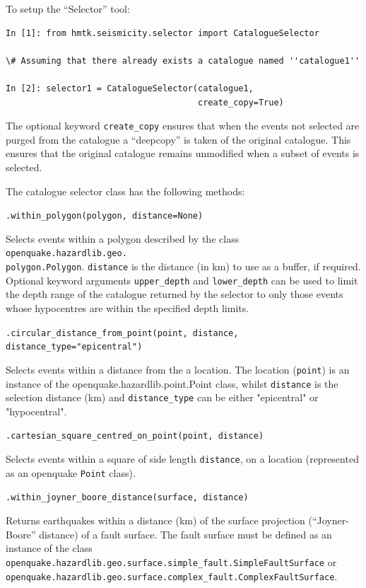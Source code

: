 To setup the ``Selector'' tool:

\begin{Verbatim}[frame=single, commandchars=\\\{\}, fontsize=\scriptsize, samepage=true]
In [1]: from hmtk.seismicity.selector import CatalogueSelector

\# Assuming that there already exists a catalogue named ''catalogue1''

In [2]: selector1 = CatalogueSelector(catalogue1,
                                      create_copy=True)

\end{Verbatim}

The optional keyword \verb=create_copy= ensures that when the events not selected are purged from the catalogue a ``deepcopy'' is taken of the original catalogue. This ensures that the original catalogue remains unmodified when a subset of events is selected.

The catalogue selector class has the following methods:

\verb;.within_polygon(polygon, distance=None);

Selects events within a polygon described by the class \verb=openquake.hazardlib.geo.=\\\verb=polygon.Polygon=. \verb=distance= is the distance (in km) to use as a buffer, if required. Optional keyword arguments \verb=upper_depth= and \verb=lower_depth= can be used to limit the depth range of the catalogue returned by the selector to only those events whose hypocentres are within the specified depth limits.

\verb;.circular_distance_from_point(point, distance, distance_type="epicentral");

Selects events within a distance from the a location. The location (\verb=point=) is an instance of the openquake.hazardlib.point.Point class, whilst \verb=distance= is the selection distance (km) and \verb=distance_type= can be either "epicentral" or "hypocentral".  

\verb;.cartesian_square_centred_on_point(point, distance);

Selects events within a square of side length \verb=distance=, on a location (represented as an openquake \verb=Point= class).

\verb;.within_joyner_boore_distance(surface, distance);

Returns earthquakes within a distance (km) of the surface projection (``Joyner-Boore'' distance) of a fault surface. The fault surface must be defined as an instance of the class \verb=openquake.hazardlib.geo.surface.simple_fault.SimpleFaultSurface= or\\ \verb=openquake.hazardlib.geo.surface.complex_fault.ComplexFaultSurface=.

